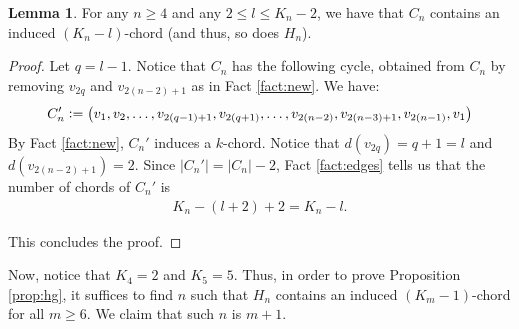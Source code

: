 \documentclass[12pt]{article}
\theoremstyle{definition}
\newtheorem{lemma}[thm]{Lemma}
\newcommand{\defeq}{\vcentcolon=}
\begin{document}
    \begin{lemma} \label{lemma:most}
        For any  $n \geq 4$ and
        any $2 \leq l \leq K_{n}-2$,
        we have that $C_{n}$ contains an induced
        $\left(K_{n} - l\right)$-chord
        (and thus, so does $H_{n}$).
    \end{lemma}
    \begin{proof}
        Let $q = l-1$. Notice that
        $C_{n}$ has the following
        cycle, obtained from $C_{n}$
        by removing $v_{2q}$ and
        $v_{2\left(n-2\right)+1}$
        as in Fact \ref{fact:new}.
        We have:
        \begin{gather*}
            C_{n}' \defeq
            \left(v_1, v_2, \ldots,
            v_{2\left(q-1\right)+1},
            v_{2\left(q+1\right)}, \ldots ,
            v_{2\left(n-2\right)},
            v_{2\left(n-3\right) + 1},
            v_{2\left(n-1\right)}, v_1\right)
        \end{gather*}
        By Fact \ref{fact:new}, 
        $C_{n}'$ induces a $k$-chord.
        Notice that
        $d\left(v_{2q}\right) = q+1 = l$
        and $d\left(v_{2\left(n-2\right)+1}\right) = 2$.
        Since $\left|C_{n}'\right| = 
        \left|C_{n}\right| - 2$, 
        Fact \ref{fact:edges} tells
        us that the number of 
        chords of $C_{n}'$ is
        \begin{gather*}
            K_{n} - \left(l + 2\right) + 2 = K_{n} - l.
        \end{gather*}
        
        This concludes the proof.
    \end{proof}

    Now, notice that $K_{4} = 2$ and $K_{5} = 5$.
    Thus, in order to prove Proposition \ref{prop:hg},
    it suffices to find $n$ such that $H_{n}$ contains
    an induced $\left(K_{m}-1\right)$-chord for
    all $m \geq 6$. We claim that such $n$ is $m+1$.
\end{document}
